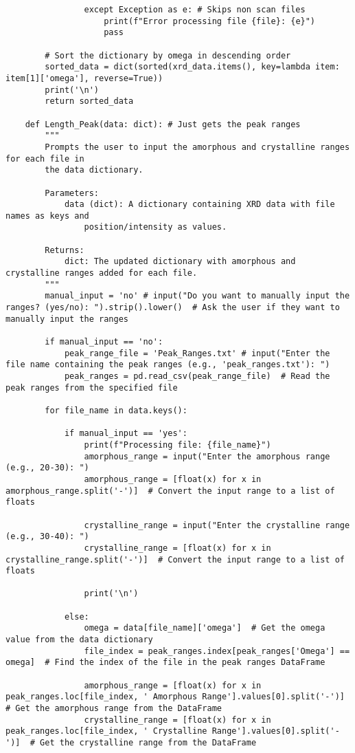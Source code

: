 \begin{lstlisting}
                except Exception as e: # Skips non scan files
                    print(f"Error processing file {file}: {e}")
                    pass

        # Sort the dictionary by omega in descending order
        sorted_data = dict(sorted(xrd_data.items(), key=lambda item: item[1]['omega'], reverse=True))
        print('\n')
        return sorted_data

    def Length_Peak(data: dict): # Just gets the peak ranges
        """
        Prompts the user to input the amorphous and crystalline ranges for each file in 
        the data dictionary.

        Parameters:
            data (dict): A dictionary containing XRD data with file names as keys and 
                position/intensity as values.

        Returns:
            dict: The updated dictionary with amorphous and crystalline ranges added for each file.
        """
        manual_input = 'no' # input("Do you want to manually input the ranges? (yes/no): ").strip().lower()  # Ask the user if they want to manually input the ranges

        if manual_input == 'no':
            peak_range_file = 'Peak_Ranges.txt' # input("Enter the file name containing the peak ranges (e.g., 'peak_ranges.txt'): ")
            peak_ranges = pd.read_csv(peak_range_file)  # Read the peak ranges from the specified file

        for file_name in data.keys():

            if manual_input == 'yes':
                print(f"Processing file: {file_name}")
                amorphous_range = input("Enter the amorphous range (e.g., 20-30): ")
                amorphous_range = [float(x) for x in amorphous_range.split('-')]  # Convert the input range to a list of floats

                crystalline_range = input("Enter the crystalline range (e.g., 30-40): ")
                crystalline_range = [float(x) for x in crystalline_range.split('-')]  # Convert the input range to a list of floats

                print('\n')

            else:
                omega = data[file_name]['omega']  # Get the omega value from the data dictionary
                file_index = peak_ranges.index[peak_ranges['Omega'] == omega]  # Find the index of the file in the peak ranges DataFrame

                amorphous_range = [float(x) for x in peak_ranges.loc[file_index, ' Amorphous Range'].values[0].split('-')]  # Get the amorphous range from the DataFrame
                crystalline_range = [float(x) for x in peak_ranges.loc[file_index, ' Crystalline Range'].values[0].split('-')]  # Get the crystalline range from the DataFrame


\end{lstlisting}
